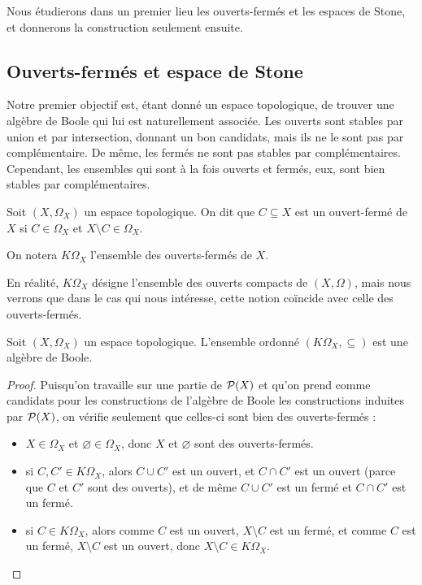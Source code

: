 Nous étudierons dans un premier lieu les ouverts-fermés et les espaces de Stone,
et donnerons la construction seulement ensuite.

\subsection{Ouverts-fermés et espace de Stone}

Notre premier objectif est, étant donné un espace topologique, de trouver une
algèbre de Boole qui lui est naturellement associée. Les ouverts sont stables
par union et par intersection, donnant un bon candidats, mais ils ne le sont pas
par complémentaire. De même, les fermés ne sont pas stables par complémentaires.
Cependant, les ensembles qui sont à la fois ouverts et fermés, eux, sont bien
stables par complémentaires.

\begin{definition}
  Soit $(X,\Omega_X)$ un espace topologique. On dit que $C\subseteq X$ est un
  ouvert-fermé de $X$ si $C\in \Omega_X$ et $X\setminus C \in \Omega_X$.

  On notera $K\Omega_X$ l'ensemble des ouverts-fermés de $X$.
\end{definition}

\begin{remark}
  En réalité, $K\Omega_X$ désigne l'ensemble des ouverts compacts de
  $(X,\Omega)$, mais nous verrons que dans le cas qui nous intéresse, cette
  notion coïncide avec celle des ouverts-fermés.
\end{remark}

\begin{property}
  Soit $(X,\Omega_X)$ un espace topologique. L'ensemble ordonné
  $(K\Omega_X,\subseteq)$ est une algèbre de Boole.
\end{property}

\begin{proof}
  Puisqu'on travaille sur une partie de $\mathcal{P}(X)$ et qu'on prend comme
  candidats pour les constructions de l'algèbre de Boole les constructions
  induites par $\mathcal{P}(X)$, on vérifie seulement que celles-ci sont bien
  des ouverts-fermés :
  \begin{itemize}
  \item $X\in\Omega_X$ et $\varnothing\in\Omega_X$, donc $X$ et $\varnothing$
    sont des ouverts-fermés.
  \item si $C,C'\in K\Omega_X$, alors $C\cup C'$ est un ouvert, et $C\cap C'$
    est un ouvert (parce que $C$ et $C'$ sont des ouverts), et de même
    $C\cup C'$ est un fermé et $C\cap C'$ est un fermé.
  \item si $C\in K\Omega_X$, alors comme $C$ est un ouvert, $X\setminus C$ est
    un fermé, et comme $C$ est un fermé, $X\setminus C$ est un ouvert, donc
    $X\setminus C \in K\Omega_X$.
  \end{itemize}
\end{proof}

